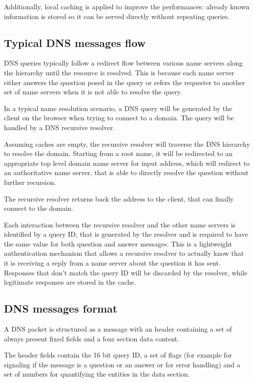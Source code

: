 \documentclass[11pt,a4paper]{article}
\begin{document}
\noindent
Additionally, local caching is applied to improve the performances: already known information is stored so it can be served directly without repeating queries.

\subsection{Typical DNS messages flow}
DNS queries typically follow a redirect flow between various name servers along the hierarchy until the resource is resolved. This is because each name server either answers the question posed in the query or refers the requester to another set of name servers when it is not able to resolve the query.

\hfill \break
\noindent
In a typical name resolution scenario, a DNS query will be generated by the client on the browser when trying to connect to a domain. The query will be handled by a DNS recursive resolver.

\noindent
Assuming caches are empty, the recursive resolver will traverse the DNS hierarchy to resolve the domain. Starting from a root name, it will be redirected to an appropriate top level domain name server for input address, which will redirect to an authoritative name server, that is able to directly resolve the question without further recursion.

\noindent
The recursive resolver returns back the address to the client, that can finally connect to the domain.

\hfill \break
\noindent
Each interaction between the recursive resolver and the other name servers is identified by a query ID, that is generated by the resolver and is required to have the same value for both question and answer messages. This is a lightweight authentication mechanism that allows a recursive resolver to actually know that it is receiving a reply from a name server about the question it has sent. Responses that don't match the query ID will be discarded by the resolver, while legitimate responses are stored in the cache.

\subsection{DNS messages format}

A DNS packet is structured as a message with an header containing a set of always present fixed fields and a four section data content.

\noindent
The header fields contain the 16 bit query ID, a set of flags (for example for signaling if the message is a question or an answer or for error handling) and a set of numbers for quantifying the entities in the data section.
\end{document}
